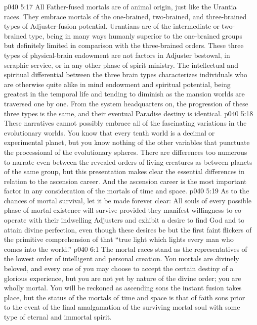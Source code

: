\vs p040 5:17 \pc {} All Father\hyp{}fused mortals are of animal origin, just like the Urantia races. They embrace mortals of the one\hyp{}brained, two\hyp{}brained, and three\hyp{}brained types of Adjuster\hyp{}fusion potential. Urantians are of the intermediate or two\hyp{}brained type, being in many ways humanly superior to the one\hyp{}brained groups but definitely limited in comparison with the three\hyp{}brained orders. These three types of physical\hyp{}brain endowment are not factors in Adjuster bestowal, in seraphic service, or in any other phase of spirit ministry. The intellectual and spiritual differential between the three brain types characterizes individuals who are otherwise quite alike in mind endowment and spiritual potential, being greatest in the temporal life and tending to diminish as the mansion worlds are traversed one by one. From the system headquarters on, the progression of these three types is the same, and their eventual Paradise destiny is identical.
\vs p040 5:18 \pc {} These narratives cannot possibly embrace all of the fascinating variations in the evolutionary worlds. You know that every tenth world is a decimal or experimental planet, but you know nothing of the other variables that punctuate the processional of the evolutionary spheres. There are differences too numerous to narrate even between the revealed orders of living creatures as between planets of the same group, but this presentation makes clear the essential differences in relation to the ascension career. And the ascension career is the most important factor in any consideration of the mortals of time and space.
\vs p040 5:19 \pc As to the chances of mortal survival, let it be made forever clear: All souls of every possible phase of mortal existence will survive provided they manifest willingness to co\hyp{}operate with their indwelling Adjusters and exhibit a desire to find God and to attain divine perfection, even though these desires be but the first faint flickers of the primitive comprehension of that “true light which lights every man who comes into the world.”
\vs p040 6:1 The mortal races stand as the representatives of the lowest order of intelligent and personal creation. You mortals are divinely beloved, and every one of you may choose to accept the certain destiny of a glorious experience, but you are not yet by nature of the divine order; you are wholly mortal. You will be reckoned as ascending sons the instant fusion takes place, but the status of the mortals of time and space is that of faith sons prior to the event of the final amalgamation of the surviving mortal soul with some type of eternal and immortal spirit.

